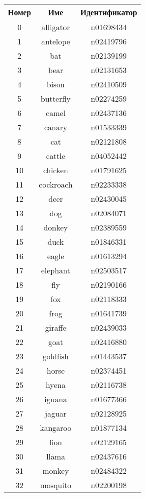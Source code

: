 \begin{longtable}{ | c | c | c | }
\hline
\textbf{Номер} & \textbf{Име} & \textbf{Идентификатор} \\ \hline \hline
0 & alligator & n01698434 \\ \hline
1 & antelope & n02419796 \\ \hline
2 & bat & n02139199 \\ \hline
3 & bear & n02131653 \\ \hline
4 & bison & n02410509 \\ \hline
5 & butterfly & n02274259 \\ \hline
6 & camel & n02437136 \\ \hline
7 & canary & n01533339 \\ \hline
8 & cat & n02121808 \\ \hline
9 & cattle & n04052442 \\ \hline
10 & chicken & n01791625 \\ \hline
11 & cockroach & n02233338 \\ \hline
12 & deer & n02430045 \\ \hline
13 & dog & n02084071 \\ \hline
14 & donkey & n02389559 \\ \hline
15 & duck & n01846331 \\ \hline
16 & eagle & n01613294 \\ \hline
17 & elephant & n02503517 \\ \hline
18 & fly & n02190166 \\ \hline
19 & fox & n02118333 \\ \hline
20 & frog & n01641739 \\ \hline
21 & giraffe & n02439033 \\ \hline
22 & goat & n02416880 \\ \hline
23 & goldfish & n01443537 \\ \hline
24 & horse & n02374451 \\ \hline
25 & hyena & n02116738 \\ \hline
26 & iguana & n01677366 \\ \hline
27 & jaguar & n02128925 \\ \hline
28 & kangaroo & n01877134 \\ \hline
29 & lion & n02129165 \\ \hline
30 & llama & n02437616 \\ \hline
31 & monkey & n02484322 \\ \hline
32 & mosquito & n02200198 \\ \hline

\end{longtable}
